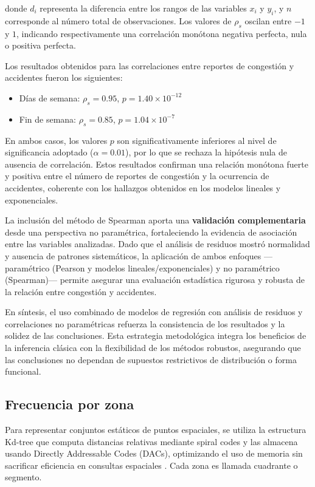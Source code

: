 \documentclass[12pt]{article}
\begin{document}
donde $d_i$ representa la diferencia entre los rangos de las variables $x_i$ y $y_i$, y $n$ corresponde al número total de observaciones. Los valores de $\rho_s$ oscilan entre $-1$ y $1$, indicando respectivamente una correlación monótona negativa perfecta, nula o positiva perfecta.

Los resultados obtenidos para las correlaciones entre reportes de congestión y accidentes fueron los siguientes:

\begin{itemize}
    \item Días de semana: $\rho_s = 0.95$, $p = 1.40 \times 10^{-12}$
    \item Fin de semana: $\rho_s = 0.85$, $p = 1.04 \times 10^{-7}$
\end{itemize}

En ambos casos, los valores $p$ son significativamente inferiores al nivel de significancia adoptado ($\alpha = 0.01$), por lo que se rechaza la hipótesis nula de ausencia de correlación. Estos resultados confirman una relación monótona fuerte y positiva entre el número de reportes de congestión y la ocurrencia de accidentes, coherente con los hallazgos obtenidos en los modelos lineales y exponenciales.

La inclusión del método de Spearman aporta una \textbf{validación complementaria} desde una perspectiva no paramétrica, fortaleciendo la evidencia de asociación entre las variables analizadas. Dado que el análisis de residuos mostró normalidad y ausencia de patrones sistemáticos, la aplicación de ambos enfoques —paramétrico (Pearson y modelos lineales/exponenciales) y no paramétrico (Spearman)— permite asegurar una evaluación estadística rigurosa y robusta de la relación entre congestión y accidentes.

En síntesis, el uso combinado de modelos de regresión con análisis de residuos y correlaciones no paramétricas refuerza la consistencia de los resultados y la solidez de las conclusiones. Esta estrategia metodológica integra los beneficios de la inferencia clásica con la flexibilidad de los métodos robustos, asegurando que las conclusiones no dependan de supuestos restrictivos de distribución o forma funcional.


\subsection{Frecuencia por zona} \label{ssec:freq_zone}

Para representar conjuntos estáticos de puntos espaciales, se utiliza la estructura Kd-tree que computa distancias relativas mediante spiral codes y las almacena usando Directly Addressable Codes (DACs), optimizando el uso de memoria sin sacrificar eficiencia en consultas espaciales \parencite{gutierrez2023ckdtree}. Cada zona es llamada cuadrante o segmento.
\end{document}
